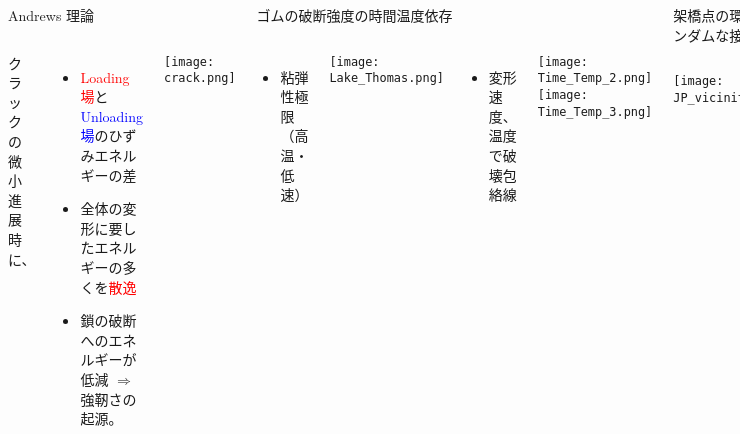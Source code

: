 \begin{columns}[totalwidth=.85\linewidth]
		\begin{itembox}[l]{Andrews 理論\cite{andrews}}
			\begin{columns}[totalwidth=\textwidth]
					クラックの微小進展時に、
					\begin{itemize}
						\item
						\textcolor{red}{Loading 場}と\textcolor{blue}{Unloading 場}のひずみエネルギーの差
						\item
						全体の変形に要したエネルギーの多くを\textcolor{red}{散逸}
						\item
						鎖の破断へのエネルギーが低減 $\Rightarrow$ \alert{強靭さの起源。}
					\end{itemize}	
					\texttt{[image: crack.png]}     
			\end{columns}
		\end{itembox}

		\begin{itembox}[l]{ゴムの破断強度の時間温度依存}
			\begin{columns}[totalwidth=\textwidth]
				\begin{itemize}
					\item \alert{粘弾性極限}\cite{lake}（高温・低速）
					
				\end{itemize}
				\texttt{[image: Lake\_Thomas.png]}
				
				\begin{itemize}
					\item 変形速度、温度\cite{smith} で\alert{破壊包絡線}
				\end{itemize}
				\begin{columns}[\textwidth]
						\centering
						\texttt{[image: Time\_Temp\_2.png]}
						\centering
						\texttt{[image: Time\_Temp\_3.png]}
					\end{columns}
				\end{columns}
		\end{itembox}

		\begin{itembox}[l]{架橋点の環境とランダムな接続性\cite{flory}}
			\begin{columns}[totalwidth=\textwidth]
				\centering
					\texttt{[image: JP\_vicinity.png]}


\end{columns}
\end{itembox}
\end{columns}
